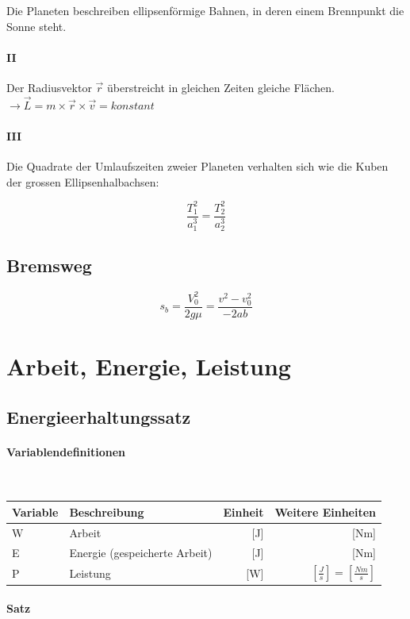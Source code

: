 \documentclass[a4paper,twoside,10pt]{article}
\newcommand{\lbparagraph}[1]{\paragraph{#1}\mbox{}\\}
\begin{document}
Die Planeten beschreiben ellipsenförmige Bahnen, in deren einem Brennpunkt die Sonne steht.

\paragraph{II}

Der Radiusvektor $\vec{r}$ überstreicht in gleichen Zeiten gleiche Flächen. $\rightarrow \vec{L} = m \times \vec{r} \times \vec{v} = konstant$

\paragraph{III}

Die Quadrate der Umlaufszeiten zweier Planeten verhalten sich wie die Kuben der grossen Ellipsenhalbachsen:

\begin{equation}
    \frac{T_1^2}{a_1^3} = \frac{T_2^2}{a_2^3}
\end{equation}

\subsection{Bremsweg}

\begin{equation}
    s_b = \frac{V_0^2}{2g\mu} = \frac{v^2 - v_0^2}{-2ab}
\end{equation}

\section{Arbeit, Energie, Leistung}

\subsection{Energieerhaltungssatz}

\lbparagraph{Variablendefinitionen}

\begin{tabular}{l|l|r|r}
    Variable & Beschreibung & Einheit & Weitere Einheiten \\
    \hline
    W & Arbeit & [J] & [Nm]  \\
    E & Energie (gespeicherte Arbeit) & [J] & [Nm] \\
    P & Leistung & [W] & $[\frac{J}{s}] = [\frac{Nm}{s}]$
\end{tabular}

\lbparagraph{Satz}
\end{document}
